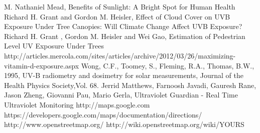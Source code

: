 \documentclass[12pt,fullpage,doublespace]{article}
\begin{document}
\newpage
\begin{thebibliography}{6}
 M. Nathaniel Mead, Benefits of Sunlight: A Bright Spot for Human Health
 Richard H. Grant and Gordon M. Heisler, Effect of Cloud Cover on UVB Exposure Under Tree Canopies: Will Climate Change Affect UVB Exposure? 
Richard H. Grant , Gordon M. Heisler and Wei Gao, Estimation of Pedestrian Level UV Exposure Under Trees
 http://articles.mercola.com/sites/articles/archive/2012/03/26/maximizing-vitamin-d-exposure.aspx
 Wong, C.F., Toomey, S., Fleming, R.A., Thomas, B.W., 1995, UV-B radiometry and dosimetry for solar measurements, Journal of the Health Physics Society,Vol. 68.
Jerrid Matthews, Farnoosh Javadi, Gauresh Rane, Jason Zheng, Giovanni Pau, Mario Gerla, Ultraviolet Guardian - Real Time Ultraviolet Monitoring
 http://maps.google.com
https://developers.google.com/maps/documentation/directions/
http://www.openstreetmap.org/
http://wiki.openstreetmap.org/wiki/YOURS

\end{thebibliography}
\end{document}
